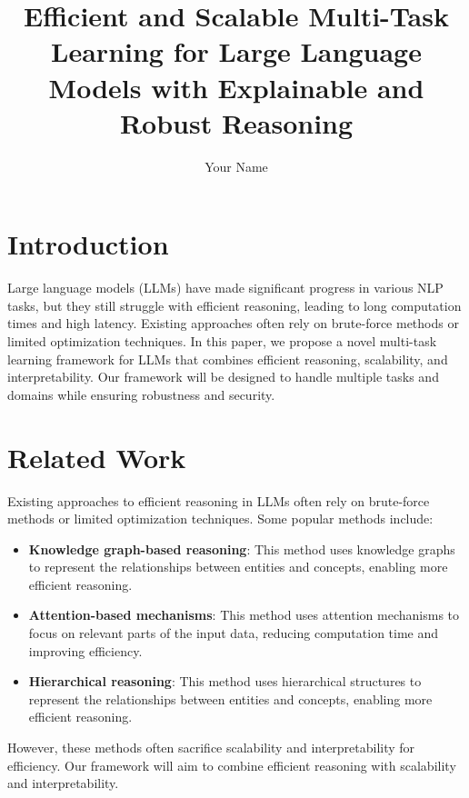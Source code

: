 \documentclass{article}
\begin{document}
\title{Efficient and Scalable Multi-Task Learning for Large Language Models with Explainable and Robust Reasoning}

\author{Your Name}

\maketitle

\section{Introduction}

Large language models (LLMs) have made significant progress in various NLP tasks, but they still struggle with efficient reasoning, leading to long computation times and high latency. Existing approaches often rely on brute-force methods or limited optimization techniques. In this paper, we propose a novel multi-task learning framework for LLMs that combines efficient reasoning, scalability, and interpretability. Our framework will be designed to handle multiple tasks and domains while ensuring robustness and security.

\section{Related Work}

Existing approaches to efficient reasoning in LLMs often rely on brute-force methods or limited optimization techniques. Some popular methods include:

\begin{itemize}
\item \textbf{Knowledge graph-based reasoning}: This method uses knowledge graphs to represent the relationships between entities and concepts, enabling more efficient reasoning.
\item \textbf{Attention-based mechanisms}: This method uses attention mechanisms to focus on relevant parts of the input data, reducing computation time and improving efficiency.
\item \textbf{Hierarchical reasoning}: This method uses hierarchical structures to represent the relationships between entities and concepts, enabling more efficient reasoning.
\end{itemize}

However, these methods often sacrifice scalability and interpretability for efficiency. Our framework will aim to combine efficient reasoning with scalability and interpretability.
\end{document}
